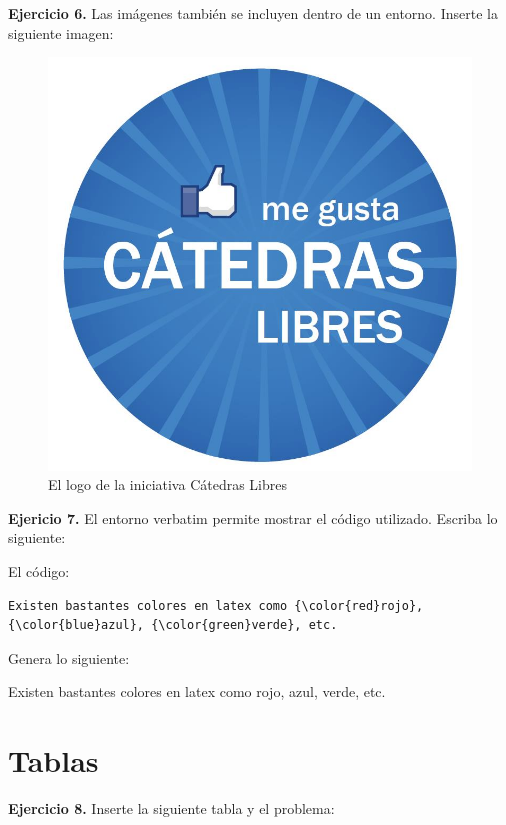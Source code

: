 \documentclass[oneside,spanish]{article}
\theoremstyle{definition}
\theoremstyle{definition}\newtheorem{definicion}{Definición}
\theoremstyle{definition}\newtheorem{ejemplo}{Ejemplo}
\theoremstyle{remark}\newtheorem{nota}{\textsc{Nota}}
\theoremstyle{definition}\newtheorem{proposicion}{Proposición}
\theoremstyle{definition}\newtheorem{problema}{Problema}
\begin{document}
\textbf{Ejercicio 6.} Las im\'agenes tambi\'en se incluyen dentro de un entorno. Inserte la siguiente imagen:

\begin{figure}[h]
\centering
\includegraphics[scale=0.15]{logo.jpg}
\caption{El logo de la iniciativa C\'atedras Libres}
\end{figure}

\newpage

\textbf{Ejericio 7.} El entorno verbatim permite mostrar el c\'odigo utilizado. Escriba lo siguiente:

El c\'odigo:
\begin{verbatim}
Existen bastantes colores en latex como {\color{red}rojo}, 
{\color{blue}azul}, {\color{green}verde}, etc.
\end{verbatim}

Genera lo siguiente:

Existen bastantes colores en latex como {\color{red}rojo}, {\color{blue}azul}, {\color{green}verde}, etc.

\section{Tablas}

\textbf{Ejercicio 8.} Inserte la siguiente tabla y el problema:
\end{document}
